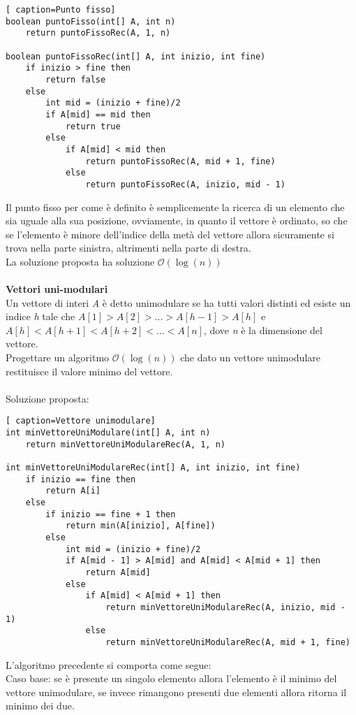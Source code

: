 \documentclass[../cheatSheetAlgoritmi.tex]{subfiles}
\begin{document}
\begin{lstlisting}[ caption=Punto fisso]
boolean puntoFisso(int[] A, int n)
	return puntoFissoRec(A, 1, n)

boolean puntoFissoRec(int[] A, int inizio, int fine)
	if inizio > fine then
    	return false
  	else
    	int mid = (inizio + fine)/2
    	if A[mid] == mid then
      		return true
    	else
      		if A[mid] < mid then
        		return puntoFissoRec(A, mid + 1, fine)
      		else
        		return puntoFissoRec(A, inizio, mid - 1)
\end{lstlisting}
Il punto fisso per come è definito è semplicemente la ricerca di un elemento che sia uguale alla sua posizione, ovviamente, in quanto il vettore è ordinato, so che se l'elemento è minore dell'indice della metà del vettore allora sicuramente si trova nella parte sinistra, altrimenti nella parte di destra. \\
La soluzione proposta ha soluzione $\mathcal{O}(\log(n))$
\\\\
\textbf{Vettori uni-modulari} \\
Un vettore di interi \textit{A} è detto unimodulare se ha tutti valori distinti ed esiste un indice \textit{h} tale che $ A[1] > A[2] > ... > A[h-1] > A[h] $ e $A[h] < A[h+1] < A[h+2] < ... < A[n]$, dove \textit{n} è la dimensione del vettore.\\ Progettare un algoritmo $\mathcal{O}(\log(n))$ che dato un vettore unimodulare restituisce il valore minimo del vettore.\\\\
Soluzione proposta:
\begin{lstlisting}[ caption=Vettore unimodulare]
int minVettoreUniModulare(int[] A, int n)
	return minVettoreUniModulareRec(A, 1, n)
	
int minVettoreUniModulareRec(int[] A, int inizio, int fine)
	if inizio == fine then
    	return A[i]
  	else
    	if inizio == fine + 1 then
      		return min(A[inizio], A[fine])
    	else
      		int mid = (inizio + fine)/2 
      		if A[mid - 1] > A[mid] and A[mid] < A[mid + 1] then
        		return A[mid]
      		else
        		if A[mid] < A[mid + 1] then
          			return minVettoreUniModulareRec(A, inizio, mid - 1)
        		else
          			return minVettoreUniModulareRec(A, mid + 1, fine)
\end{lstlisting}
L'algoritmo precedente si comporta come segue: \\
Caso base: 
se è presente un singolo elemento allora l'elemento è il minimo del vettore unimodulare, se invece rimangono presenti due elementi allora ritorna il minimo dei due. \\
\end{document}
